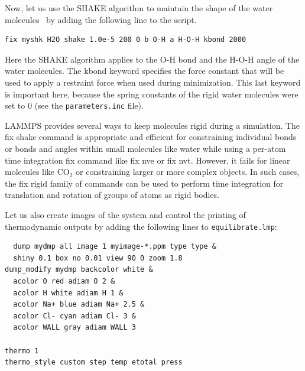 \documentclass[9pt,tutorial]{livecoms}
\newcommand{\lmpcmd}[1]{\colorbox{listing}{\textcolor{command}{\small{#1}}}} %
\newcommand{\flecmd}[1]{\textcolor{command}{\texttt{#1}}} %
\begin{document}
Now, let us use the SHAKE algorithm to maintain the shape of the
water molecules~\cite{ryckaert1977numerical, andersen1983rattle}
by adding the following line to the script.
\begin{lstlisting}
fix myshk H2O shake 1.0e-5 200 0 b O-H a H-O-H kbond 2000
\end{lstlisting}
Here the SHAKE algorithm applies to the \lmpcmd{O-H} bond and the \lmpcmd{H-O-H} angle
of the water molecules.  The \lmpcmd{kbond} keyword specifies the force constant that will be
used to apply a restraint force when used during minimization.  This last keyword is important
here, because the spring constants of the rigid water molecules were set
to 0 (see the \flecmd{parameters.inc} file).

\begin{note}
  LAMMPS provides several ways to keep molecules rigid during a simulation.
  The \lmpcmd{fix shake} command is appropriate and efficient for constraining
  individual bonds or bonds and angles within small molecules like water while using
  a per-atom time integration fix command like \lmpcmd{fix nve} or \lmpcmd{fix nvt}.
  However, it fails for linear molecules like CO$_2$ or constraining larger or more
  complex objects.
  In such cases, the \lmpcmd{fix rigid} family of commands can be used to perform
  time integration for translation and rotation of groups of atoms as rigid bodies.
\end{note}

Let us also create images of the system and control
the printing of thermodynamic outputs by adding the following lines
to \flecmd{equilibrate.lmp}:
\begin{lstlisting}
  dump mydmp all image 1 myimage-*.ppm type type &
  shiny 0.1 box no 0.01 view 90 0 zoom 1.8
dump_modify mydmp backcolor white &
  acolor O red adiam O 2 &
  acolor H white adiam H 1 &
  acolor Na+ blue adiam Na+ 2.5 &
  acolor Cl- cyan adiam Cl- 3 &
  acolor WALL gray adiam WALL 3

thermo 1
thermo_style custom step temp etotal press
\end{lstlisting}
\end{document}
